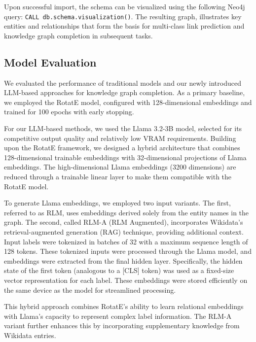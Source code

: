 Upon successful import, the schema can be visualized using the following Neo4j query: \texttt{CALL db.schema.visualization()}.
The resulting graph, illustrates key entities and relationships that form the basis for multi-class link prediction and knowledge graph completion in subsequent tasks.

\subsection*{Model Evaluation}
\label{model-evaluation}
We evaluated the performance of traditional models and our newly introduced LLM-based approaches for knowledge graph completion.
As a primary baseline, we employed the RotatE model, configured with 128-dimensional embeddings and trained for 100 epochs with early stopping.

For our LLM-based methods, we used the Llama 3.2-3B model, selected for its competitive output quality and relatively low VRAM requirements.
Building upon the RotatE framework, we designed a hybrid architecture that combines 128-dimensional trainable embeddings with 32-dimensional projections of Llama embeddings.
The high-dimensional Llama embeddings (3200 dimensions) are reduced through a trainable linear layer to make them compatible with the RotatE model.

To generate Llama embeddings, we employed two input variants.
The first, referred to as RLM, uses embeddings derived solely from the entity names in the graph.
The second, called RLM-A (RLM Augmented), incorporates Wikidata's retrieval-augmented generation (RAG) technique, providing additional context.
Input labels were tokenized in batches of 32 with a maximum sequence length of 128 tokens.
These tokenized inputs were processed through the Llama model, and embeddings were extracted from the final hidden layer.
Specifically, the hidden state of the first token (analogous to a [CLS] token) was used as a fixed-size vector representation for each label.
These embeddings were stored efficiently on the same device as the model for streamlined processing.

This hybrid approach combines RotatE's ability to learn relational embeddings with Llama's capacity to represent complex label information.
The RLM-A variant further enhances this by incorporating supplementary knowledge from Wikidata entries.


